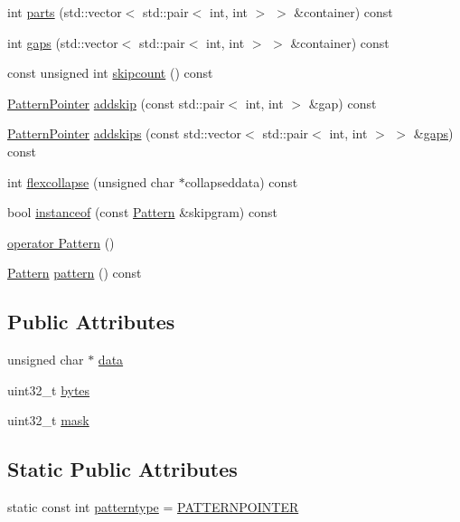 \begin{DoxyCompactItemize}
\item 
int \hyperlink{classPatternPointer_ae9da2891140e37c57d13c5dae26c3c2f}{parts} (std\+::vector$<$ std\+::pair$<$ int, int $>$ $>$ \&container) const 
\item 
int \hyperlink{classPatternPointer_a898c7d000bae5fe5d968de3f1b863551}{gaps} (std\+::vector$<$ std\+::pair$<$ int, int $>$ $>$ \&container) const 
\item 
const unsigned int \hyperlink{classPatternPointer_aef0eeb74abf554cb37c8917e593aa791}{skipcount} () const 
\item 
\hyperlink{classPatternPointer}{Pattern\+Pointer} \hyperlink{classPatternPointer_a981fcefe815d9defe35ccba1b9592f4a}{addskip} (const std\+::pair$<$ int, int $>$ \&gap) const 
\item 
\hyperlink{classPatternPointer}{Pattern\+Pointer} \hyperlink{classPatternPointer_a1caeebb778f40989f73f54a2badc3be2}{addskips} (const std\+::vector$<$ std\+::pair$<$ int, int $>$ $>$ \&\hyperlink{classPatternPointer_a898c7d000bae5fe5d968de3f1b863551}{gaps}) const 
\item 
int \hyperlink{classPatternPointer_aafa8231c856c63a28c1792027107c5f0}{flexcollapse} (unsigned char $\ast$collapseddata) const 
\item 
bool \hyperlink{classPatternPointer_ac7f372d6738afa40d5b3f11a59bfa301}{instanceof} (const \hyperlink{classPattern}{Pattern} \&skipgram) const 
\item 
\hyperlink{classPatternPointer_a7b785c4e04542d1d0c026272fa2fc387}{operator Pattern} ()
\item 
\hyperlink{classPattern}{Pattern} \hyperlink{classPatternPointer_a5f7e3d7cd6431e699e166814967d1741}{pattern} () const 
\end{DoxyCompactItemize}
\subsection*{Public Attributes}
\begin{DoxyCompactItemize}
\item 
unsigned char $\ast$ \hyperlink{classPatternPointer_ad754ecbbeeb29fbebb075f520884e11d}{data}
\item 
uint32\+\_\+t \hyperlink{classPatternPointer_a60d057d9e790b1c1686c440b91a425a7}{bytes}
\item 
uint32\+\_\+t \hyperlink{classPatternPointer_a7f75c1464a5782d28b8dc338ab3788f1}{mask}
\end{DoxyCompactItemize}
\subsection*{Static Public Attributes}
\begin{DoxyCompactItemize}
\item 
static const int \hyperlink{classPatternPointer_a51173670c6a2294d3c0eb4fe38d48a59}{patterntype} = \hyperlink{pattern_8h_a351dc5aa88481a949638aeb6cc5e6754a5f20d34b0b2fd5023f48ddd94e4fb617}{P\+A\+T\+T\+E\+R\+N\+P\+O\+I\+N\+T\+E\+R}
\end{DoxyCompactItemize}


